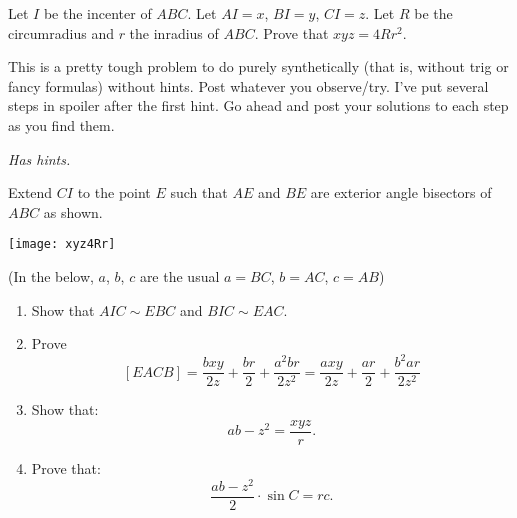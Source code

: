 Let $I$ be the incenter of $ABC$. Let $AI = x$, $BI = y$, $CI = z$. Let $R$ be the circumradius and $r$ the inradius of $ABC$. Prove that $xyz = 4Rr^2$.

This is a pretty tough problem to do purely synthetically (that is, without trig or fancy formulas) without hints. Post whatever you observe/try. I've put several steps in spoiler after the first hint. Go ahead and post your solutions to each step as you find them.

\textit {Has hints.}
\begin{sketch}
Extend $CI$ to the point $E$ such that $AE$ and $BE$ are exterior angle bisectors of $ABC$ as shown.

\begin{center}
    \texttt{[image: xyz4Rr]}
\end{center}


(In the below, $a$, $b$, $c$ are the usual $a = BC$, $b = AC$, $c = AB$)


    \begin{enumerate}
        \item Show that $AIC \sim EBC$ and $BIC \sim EAC$.
        
        
        \item Prove$$[EACB] = \dfrac{bxy}{2z} + \dfrac {br}2 + \dfrac {a^2br}{2z^2} = \dfrac{ axy}{2z} + \dfrac {ar}2 + \dfrac {b^2ar}{2z^2}$$
        
        
        \item Show that:$$ab - z^2 = \dfrac {xyz}r.$$
        
        
        \item Prove that:$$ \dfrac {ab - z^2}2 \cdot \sin C = rc. $$
    \end{enumerate}
\end{sketch}

